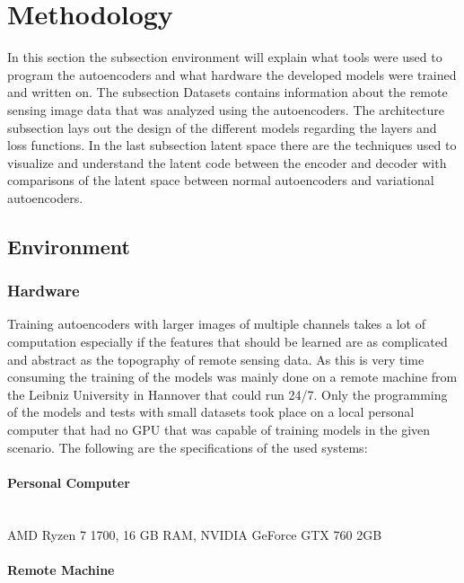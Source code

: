 \section{Methodology}

In this section the subsection environment will explain what tools were used to program the autoencoders
and what hardware the developed models were trained and written on. The subsection Datasets 
contains information about the remote sensing image data that was analyzed using the autoencoders. 
The architecture subsection lays out 
the design of the different models regarding the layers and loss functions. In the last subsection 
latent space there are the techniques used to visualize and understand the latent code between the 
encoder and decoder with comparisons of the latent space between normal autoencoders and variational
autoencoders.

\subsection{Environment}

\subsubsection{Hardware}

Training autoencoders with larger images of multiple channels takes a lot of computation especially if the 
features that should be learned are as complicated and abstract as the topography of remote sensing data.
As this is very time consuming the training of the models was mainly done on a remote machine from the
Leibniz University in Hannover that could run 24/7. Only the
programming of the models and tests with small datasets took place on a local personal computer that had no
GPU that was capable of training models in the given scenario. The following
are the specifications of the used systems:\\

\paragraph{Personal Computer} \mbox{} \smallskip \\

AMD Ryzen 7 1700, 16 GB RAM, NVIDIA GeForce GTX 760 2GB

\paragraph{Remote Machine} \mbox{} \smallskip \\

